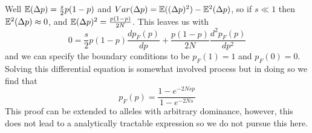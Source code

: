 Well $\mathbb{E}(\Delta p) = \frac{s}{2}p(1-p)$ and $Var(\Delta p)= \mathbb{E}((\Delta
p)^2)-\mathbb{E}^2(\Delta p)$, so if $s \ll 1$ then $\mathbb{E}^2(\Delta p) \approx
0$, and $\mathbb{E}(\Delta p)^2 = \frac{p(1-p)}{2N}$. This leaves us with
\begin{equation}
0= \frac{s}{2}p(1-p)\frac{dp_F (p) }{dp} + \frac{p(1-p)}{2N}
\frac{d^2p_F (p) }{dp^2}
\end{equation}
and we can specify the boundary conditions to be $p_F(1)=1$ and $p_F(0)=0$. 
Solving this differential equation is somewhat involved process but in
doing so we find that
\begin{equation}
p_F(p) = \frac{1-e^{-2Ns p }}{1-e^{-2Ns}}
\end{equation}
This proof can be extended
to alleles with arbitrary dominance, however, this does not lead to a
analytically tractable expression so we do not pursue this here. 

